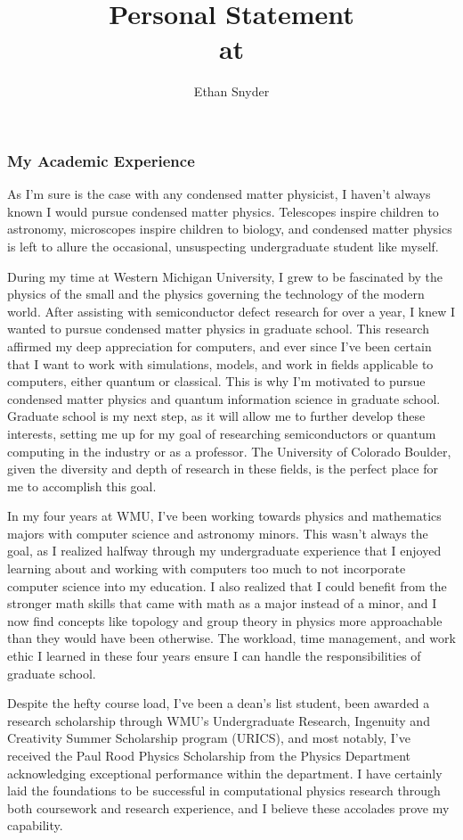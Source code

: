 \documentclass[11pt]{article}
\title{\vspace{-5em}Personal Statement\\
	\large \dept{} at \school{}}
\author{Ethan Snyder}
\date{}
\newcommand{\school}{University of Colorado Boulder}
\begin{document}
\maketitle
\subsubsection*{My Academic Experience}
As I'm sure is the case with any condensed matter physicist, I haven't always known I would pursue condensed matter physics. Telescopes inspire children to astronomy, microscopes inspire children to biology, and condensed matter physics is left to allure the occasional, unsuspecting undergraduate student like myself.

During my time at Western Michigan University, I grew to be fascinated by the physics of the small and the physics governing the technology of the modern world. After assisting with semiconductor defect research for over a year, I knew I wanted to pursue condensed matter physics in graduate school. This research affirmed my deep appreciation for computers, and ever since I've been certain that I want to work with simulations, models, and work in fields applicable to computers, either quantum or classical. This is why I'm motivated to pursue condensed matter physics and quantum information science in graduate school. Graduate school is my next step, as it will allow me to further develop these interests, setting me up for my goal of researching semiconductors or quantum computing in the industry or as a professor. The \school{}, given the diversity and depth of research in these fields, is the perfect place for me to accomplish this goal.

In my four years at WMU, I've been working towards physics and mathematics majors with computer science and astronomy minors. This wasn't always the goal, as I realized halfway through my undergraduate experience that I enjoyed learning about and working with computers too much to not incorporate computer science into my education. I also realized that I could benefit from the stronger math skills that came with math as a major instead of a minor, and I now find concepts like topology and group theory in physics more approachable than they would have been otherwise. The workload, time management, and work ethic I learned in these four years ensure I can handle the responsibilities of graduate school.

Despite the hefty course load, I've been a dean's list student, been awarded a research scholarship through WMU's Undergraduate Research, Ingenuity and Creativity Summer Scholarship program (URICS), and most notably, I've received the Paul Rood Physics Scholarship from the Physics Department acknowledging exceptional performance within the department. I have certainly laid the foundations to be successful in computational physics research through both coursework and research experience, and I believe these accolades prove my capability.
\end{document}
